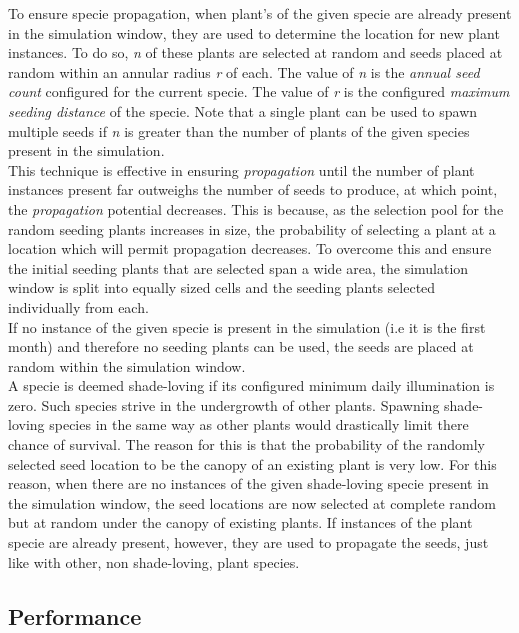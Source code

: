 To ensure specie propagation, when plant's of the given specie are already present in the simulation window, they are used to determine the location for new plant instances. To do so, \textit{n} of these plants are selected at random and seeds placed at random within an annular radius \textit{r} of each. The value of \textit{n} is the \textit{annual seed count} configured for the current specie. The value of \textit{r} is the configured \textit{maximum seeding distance} of the specie. Note that a single plant can be used to spawn multiple seeds if \textit{n} is greater than the number of plants of the given species present in the simulation.\\
This technique is effective in ensuring \textit{propagation} until the number of plant instances present far outweighs the number of seeds to produce, at which point, the \textit{propagation} potential decreases. This is because, as the selection pool for the random seeding plants increases in size, the probability of selecting a plant at a location which will permit propagation decreases. To overcome this and ensure the initial seeding plants that are selected span a wide area, the simulation window is split into equally sized cells and the seeding plants selected individually from each. \\

If no instance of the given specie is present in the simulation (i.e it is the first month) and therefore no seeding plants can be used, the seeds are placed at random within the simulation window.\\ 

A specie is deemed shade-loving if its configured minimum daily illumination is zero. Such species strive in the undergrowth of other plants. Spawning shade-loving species in the same way as other plants would drastically limit there chance of survival. The reason for this is that the probability of the randomly selected seed location to be the canopy of an existing plant is very low. For this reason, when there are no instances of the given shade-loving specie present in the simulation window, the seed locations are now selected at complete random but at random under the canopy of existing plants. If instances of the plant specie are already present, however, they are used to propagate the seeds, just like with other, non shade-loving, plant species.

\subsection{Performance} \label{subsec:ecosytem_performance}

